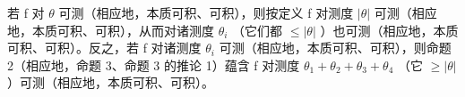 若 f 对 \(\theta\) 可测（相应地，本质可积、可积），则按定义 f 对测度 \(|\theta|\) 可测（相应地，本质可积、可积），从而对诸测度 \(\theta_{i}\) （它们都 \(\leqslant |\theta|\) ）也可测（相应地，本质可积、可积）。反之，若 f 对诸测度 \(\theta_{i}\) 可测（相应地，本质可积、可积），则命题 2（相应地，命题 3、命题 3 的推论 1）蕴含 f 对测度 \(\theta_{1} + \theta_{2} + \theta_{3} + \theta_{4}\) （它 \(\geqslant |\theta|\) ）可测（相应地，本质可积、可积）。


